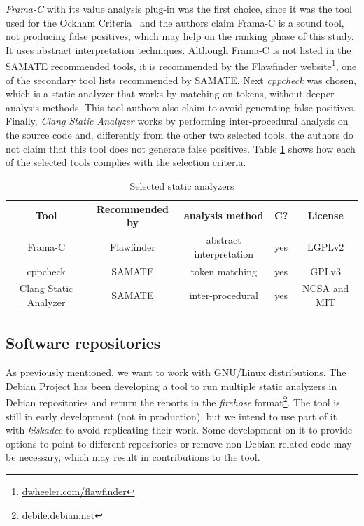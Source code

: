 \textit{Frama-C} with its value analysis plug-in was the first choice, since it
was the tool used for the Ockham Criteria~\cite{black_sate_2016} and the
authors claim Frama-C is a sound tool, not producing false positives, which may
help on the ranking phase of this study. It uses abstract interpretation
techniques. Although Frama-C is not listed in the SAMATE recommended tools, it
is recommended by the Flawfinder
website\footnote{\url{dwheeler.com/flawfinder}}, one of the secondary tool
lists recommended by SAMATE. Next \textit{cppcheck} was chosen, which is a
static analyzer that works by matching on tokens, without deeper analysis
methods. This tool authors also claim to avoid generating false positives.
Finally, \textit{Clang Static Analyzer} works by performing inter-procedural
analysis on the source code and, differently from the other two selected tools,
the authors do not claim that this tool does not generate false positives.
Table \ref{tab:tool_selection} shows how each of the selected tools complies
with the selection criteria.

\begin{table}
  \centering
  \begin{tabular}{|c|c|c|c|c|}
    \hline
    \textbf{Tool} & \textbf{Recommended by} & \textbf{analysis method} & \textbf{C?} & \textbf{License}\\
    Frama-C & Flawfinder & abstract interpretation & yes & LGPLv2\\
cppcheck & SAMATE & token matching & yes & GPLv3\\
Clang Static Analyzer & SAMATE & inter-procedural & yes & NCSA and MIT\\
    \hline
\end{tabular}
  \caption{Selected static analyzers}
  \label{tab:tool_selection}
\end{table}

\subsection{Software repositories}

As previously mentioned, we want to work with GNU/Linux distributions. The
Debian Project has been developing a tool to run multiple static analyzers in
Debian repositories and return the reports in the \textit{firehose}
format\footnote{\url{debile.debian.net}}.  The tool is still in early development
(not in production), but we intend to use part of it with \textit{kiskadee} to
avoid replicating their work. Some development on it to provide options to
point to different repositories or remove non-Debian related code may be
necessary, which may result in contributions to the tool.

